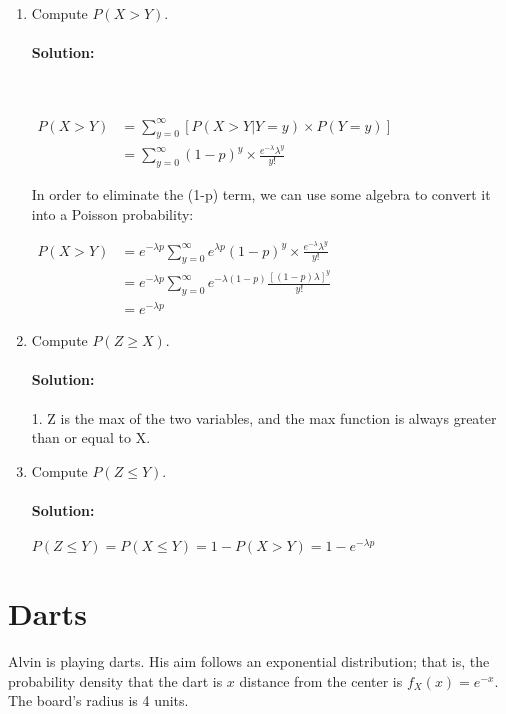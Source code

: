 \documentclass[11pt, notitlepage]{article}
\newcommand{\Question}[1]{\newpage\section{#1}}
\newenvironment{solution}{\paragraph{Solution:}}{\hfill \vspace{10mm}}
\begin{document}
\begin{enumerate}[label=\alph*.)]
    \item Compute $P(X>Y)$.
    \begin{solution}\
   
   $\begin{aligned} P(X>Y)&=\sum_{y=0}^{\infty}{[P(X>Y|Y=y)\times P(Y=y)]}\\
	&=\sum_{y=0}^{\infty}{(1-p)^y\times \frac{e^{-\lambda} \lambda ^ y}{y!}}
\end{aligned}
$
  	
  	In order to eliminate the (1-p) term, we can use some algebra to convert it into a Poisson probability:
  	
  	   $\begin{aligned} P(X>Y) &= e^{-\lambda p} \sum_{y=0}^{\infty}{e^{\lambda p}(1-p)^y\times \frac{e^{-\lambda} \lambda ^ y}{y!}} \\
  	   &= e^{-\lambda p} \sum_{y=0}^{\infty}{e^{- \lambda (1-p)} \frac{ [(1-p)\lambda] ^ y}{y!}} \\
  	   &= e^{-\lambda p}
\end{aligned}
$

    \end{solution}
    \item Compute $P(Z\geq X)$.
  	\begin{solution}
  		1. Z is the max of the two variables, and the max function is always greater than or equal to X.
  	\end{solution}
    \item Compute $P(Z\leq Y)$.
    \begin{solution}
    	$P(Z\leq Y)=P(X\leq Y)=1-P(X>Y)=1-e^{- \lambda p}$
    \end{solution}
\end{enumerate}


\Question{Darts}

Alvin is playing darts.
His aim follows an exponential distribution; that is, the probability density that the dart is $x$ distance from the center is $f_X(x) = e^{-x}$.
The board's radius is 4 units.
\end{document}
